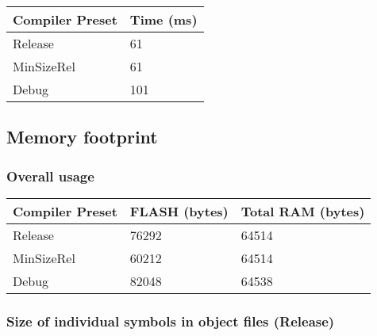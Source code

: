 \documentclass[
]{article}
\begin{document}
\begin{longtable}[]{@{}ll@{}}
\toprule
Compiler Preset & Time (ms)\tabularnewline
\midrule
\endhead
Release & 61\tabularnewline
MinSizeRel & 61\tabularnewline
Debug & 101\tabularnewline
\bottomrule
\end{longtable}

\hypertarget{memory-footprint-1}{%
\subsection{Memory footprint}\label{memory-footprint-1}}

\hypertarget{overall-usage-1}{%
\subsubsection{Overall usage}\label{overall-usage-1}}

\begin{longtable}[]{@{}lll@{}}
\toprule
Compiler Preset & FLASH (bytes) & Total RAM (bytes)\tabularnewline
\midrule
\endhead
Release & 76292 & 64514\tabularnewline
MinSizeRel & 60212 & 64514\tabularnewline
Debug & 82048 & 64538\tabularnewline
\bottomrule
\end{longtable}

\hypertarget{size-of-individual-symbols-in-object-files-release}{%
\subsubsection{Size of individual symbols in object files
(Release)}\label{size-of-individual-symbols-in-object-files-release}}
\end{document}
